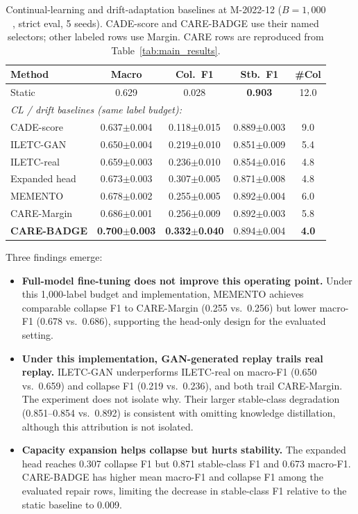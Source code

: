 \documentclass[preprint,12pt,authoryear]{elsarticle}
\let\cite\citep
\newcommand{\ours}{CARE}  %
\begin{document}
\begin{table}[!htbp]
\centering
\caption{Continual-learning and drift-adaptation baselines at M-2022-12 ($B{=}1{,}000$, strict eval, 5 seeds). CADE-score and CARE-BADGE use their named selectors; other labeled rows use Margin. CARE rows are reproduced from Table~\ref{tab:main_results}.}
\label{tab:cl_baselines}
\scriptsize
\setlength{\tabcolsep}{3pt}
\begin{tabular}{@{}l cccc@{}}
\toprule
Method & Macro & Col.\ F1 & Stb.\ F1 & \#Col \\
\midrule
Static & 0.629 & 0.028 & \textbf{0.903} & 12.0 \\
\midrule
\multicolumn{5}{l}{\textit{CL / drift baselines (same label budget):}} \\
CADE-score~\cite{yang2021cade}     & 0.637$\pm$0.004 & 0.118$\pm$0.015 & 0.889$\pm$0.003 & 9.0 \\
ILETC-GAN~\cite{zhu2023iletc}     & 0.650$\pm$0.004 & 0.219$\pm$0.010 & 0.851$\pm$0.009 & 5.4 \\
ILETC-real                         & 0.659$\pm$0.003 & 0.236$\pm$0.010 & 0.854$\pm$0.016 & 4.8 \\
Expanded head                      & 0.673$\pm$0.003 & 0.307$\pm$0.005 & 0.871$\pm$0.008 & 4.8 \\
MEMENTO~\cite{cerasuolo2024memento}& 0.678$\pm$0.002 & 0.255$\pm$0.005 & 0.892$\pm$0.004 & 6.0 \\
\midrule
\ours{}-Margin & 0.686$\pm$0.001 & 0.256$\pm$0.009 & 0.892$\pm$0.003 & 5.8 \\
\textbf{\ours{}-BADGE} & \textbf{0.700$\pm$0.003} & \textbf{0.332$\pm$0.040} & 0.894$\pm$0.004 & \textbf{4.0} \\
\bottomrule
\end{tabular}
\end{table}

Three findings emerge:
\begin{itemize}
  \item \textbf{Full-model fine-tuning does not improve this operating point.} Under this 1{,}000-label budget and implementation, MEMENTO achieves comparable collapse F1 to \ours{}-Margin (0.255 vs.\ 0.256) but lower macro-F1 (0.678 vs.\ 0.686), supporting the head-only design for the evaluated setting.
  \item \textbf{Under this implementation, GAN-generated replay trails real replay.} ILETC-GAN underperforms ILETC-real on macro-F1 (0.650 vs.\ 0.659) and collapse F1 (0.219 vs.\ 0.236), and both trail \ours{}-Margin. The experiment does not isolate why. Their larger stable-class degradation (0.851--0.854 vs.\ 0.892) is consistent with omitting knowledge distillation, although this attribution is not isolated.
  \item \textbf{Capacity expansion helps collapse but hurts stability.} The expanded head reaches 0.307 collapse F1 but 0.871 stable-class F1 and 0.673 macro-F1. \ours{}-BADGE has higher mean macro-F1 and collapse F1 among the evaluated repair rows, limiting the decrease in stable-class F1 relative to the static baseline to 0.009.
\end{itemize}
\end{document}
